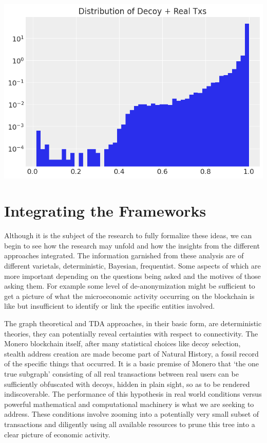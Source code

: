 \documentclass[prc, 12pt]{revtex4-1}
\begin{document}
\includegraphics[scale=0.5]{decoyreal}



\section{Integrating the Frameworks}

Although it is the subject of the research to fully formalize these ideas, we can begin to see how the research may unfold and how the insights from the different approaches integrated.  The information garnished from these analysis are of different varietals, deterministic, Bayesian, frequentist.  Some aspects of which are more important depending on the questions being asked and the motives of those asking them.  For example some level of de-anonymization might be sufficient to get a picture of what the microeconomic activity occurring on the blockchain is like but insufficient to identify or link the specific entities involved.

The graph theoretical and TDA approaches, in their basic form, are deterministic theories, they can potentially reveal certainties with respect to connectivity.  The Monero blockchain itself, after many statistical choices like decoy selection, stealth address creation are made become part of Natural History, a fossil record of the specific things that occurred.  It is a basic premise of Monero that `the one true subgraph' consisting of all real transactions between real users can be sufficiently obfuscated with decoys, hidden in plain sight, so as to be rendered indiscoverable.  The performance of this hypothesis in real world conditions versus powerful mathematical and computational machinery is what we are seeking to address.  These conditions involve zooming into a potentially very small subset of transactions and diligently using all available resources to prune this tree into a clear picture of economic activity.  
\end{document}
